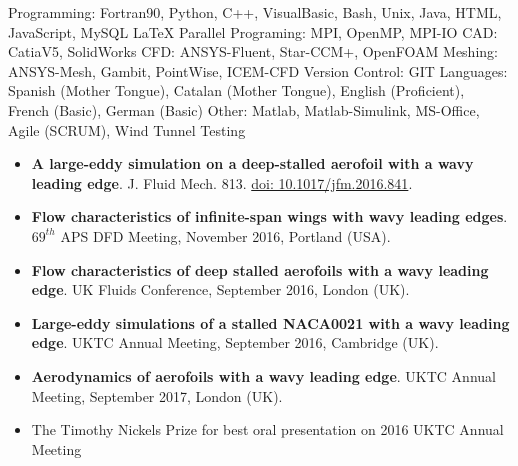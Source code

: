 \documentclass[10pt,a4paper]{article}
\begin{document}
\spacedhrule{0.5em}{-0.4em}


\inlineheadsection  %
  {Programming:}
  {Fortran90, Python, C++, VisualBasic, Bash, Unix, Java, HTML, JavaScript, MySQL \LaTeX}
\vspace{0.5em}
\inlineheadsection  %
  {Parallel Programing:}
  {MPI, OpenMP, MPI-IO}
\vspace{0.5em}
\inlineheadsection  %
  {CAD:}
  {CatiaV5, SolidWorks}
\vspace{0.5em}
\inlineheadsection  %
  {CFD:}
  {ANSYS-Fluent, Star-CCM+, OpenFOAM}
\vspace{0.5em}
\inlineheadsection  %
  {Meshing:}
  {ANSYS-Mesh, Gambit, PointWise, ICEM-CFD}
\vspace{0.5em}
\inlineheadsection  %
  {Version Control:}
  {GIT}
\vspace{0.5em}
\inlineheadsection
  {Languages:}
  {Spanish (Mother Tongue), Catalan (Mother Tongue), English (Proficient),\\ French (Basic), German (Basic)}
\vspace{0.5em}
\inlineheadsection  %
  {Other:}
  {Matlab, Matlab-Simulink, MS-Office, Agile (SCRUM), Wind Tunnel Testing}
\vspace{0.5em}

\spacedhrule{1.6em}{-0.4em}

\begin{itemize}
\item \textbf{A large-eddy simulation on a deep-stalled aerofoil with a wavy leading edge}. J. Fluid Mech. 813. \href{https://doi.org/10.1017/jfm.2016.841}{doi: 10.1017/jfm.2016.841}.
\item \textbf{Flow characteristics of infinite-span wings with wavy leading edges}. $69^{th}$ APS DFD Meeting, November 2016, Portland (USA). 
\item \textbf{Flow characteristics of deep stalled aerofoils with a wavy
leading edge}. UK Fluids Conference, September 2016, London (UK). 
\item \textbf{Large-eddy simulations of a stalled NACA0021 with a wavy
leading edge}. UKTC Annual Meeting, September 2016, Cambridge (UK).
\item \textbf{Aerodynamics of aerofoils with a wavy
leading edge}. UKTC Annual Meeting, September 2017, London (UK).
\end{itemize}

\spacedhrule{0.0em}{-0.4em}
\begin{itemize}
	\item The Timothy Nickels Prize for best oral presentation on 2016 UKTC Annual Meeting	
\end{itemize}
\end{document}
